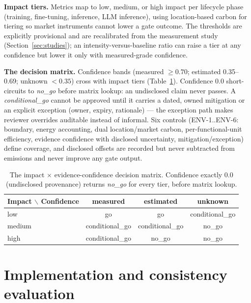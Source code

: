 \documentclass[10pt]{article}
\begin{document}
\textbf{Impact tiers.} Metrics map to low, medium, or high impact per
lifecycle phase (training, fine-tuning, inference, LLM inference), using
location-based carbon for tiering so market instruments cannot lower a gate
outcome. The thresholds are explicitly provisional and are recalibrated from
the measurement study (Section~\ref{sec:studies}); an
intensity-versus-baseline ratio can raise a tier at any confidence but lower
it only with measured-grade confidence.

\textbf{The decision matrix.} Confidence bands (measured $\geq 0.70$;
estimated 0.35--0.69; unknown $< 0.35$) cross with impact tiers
(Table~\ref{tab:matrix}). Confidence 0.0 short-circuits to \emph{no\_go}
before matrix lookup: an undisclosed claim never passes. A
\emph{conditional\_go} cannot be approved until it carries a dated, owned
mitigation or an explicit exception (owner, expiry, rationale) --- the
exception path makes reviewer overrides auditable instead of informal. Six
controls (ENV-1..ENV-6: boundary, energy accounting, dual location/market
carbon, per-functional-unit efficiency, evidence confidence with disclosed
uncertainty, mitigation/exception) define coverage, and disclosed offsets are
recorded but never subtracted from emissions and never improve any gate
output.

\begin{table}[t]
\centering
\small
\begin{tabular}{@{}lccc@{}}
\toprule
Impact $\backslash$ Confidence & measured & estimated & unknown \\
\midrule
low    & go              & go              & conditional\_go \\
medium & conditional\_go & conditional\_go & no\_go \\
high   & conditional\_go & no\_go          & no\_go \\
\bottomrule
\end{tabular}
\caption{The impact $\times$ evidence-confidence decision matrix. Confidence
exactly 0.0 (undisclosed provenance) returns \emph{no\_go} for every tier,
before matrix lookup.}
\label{tab:matrix}
\end{table}

\section{Implementation and consistency evaluation}
\end{document}
